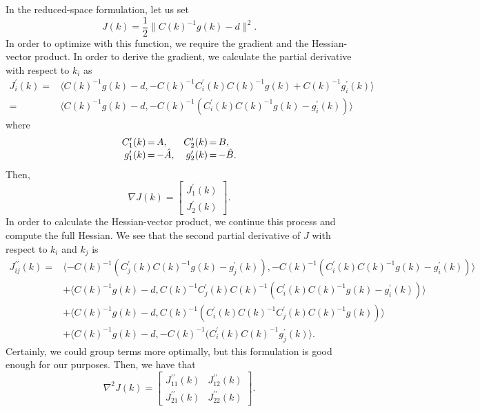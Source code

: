 \documentclass{report}
\begin{document}
        In the reduced-space formulation, let us set 
$$
    J(k) = \frac{1}{2} \| C(k)^{-1}g(k) - d \|^2.
$$
In order to optimize with this function, we require the gradient and the Hessian-vector product.  In order to derive the gradient, we calculate the partial derivative with respect to $k_i$ as
\begin{align*}
    J^\prime_i(k)
    =& \langle C(k)^{-1}g(k) - d, -C(k)^{-1} C^\prime_i(k) C(k)^{-1}g(k) + C(k)^{-1}g^\prime_i(k)\rangle\\
    =& \langle C(k)^{-1}g(k) - d, -C(k)^{-1} (C^\prime_i(k) C(k)^{-1}g(k) - g^\prime_i(k))\rangle
\end{align*}
where
$$\begin{array}{r@{\,=\,}lr@{\,=\,}l}
        C^\prime_1(k) & A,&
        C^\prime_2(k) & B,\\
        g^\prime_1(k) & -\hat{A},&
        g^\prime_2(k) & -\hat{B}.
\end{array}$$
Then,
$$
        \nabla J(k) = \begin{bmatrix}
                J^\prime_1(k)\\
                J^\prime_2(k)
            \end{bmatrix}.
$$
In order to calculate the Hessian-vector product, we continue this process and compute the full Hessian.  We see that the second partial derivative of $J$ with respect to $k_i$ and $k_j$ is
\begin{align*}
    J^{\prime\prime}_{ij}(k)
        =& \langle -C(k)^{-1} (C^\prime_j(k) C(k)^{-1}g(k) - g^\prime_j(k)), -C(k)^{-1} (C^\prime_i(k) C(k)^{-1}g(k) - g^\prime_i(k))\rangle\\
        &+ \langle C(k)^{-1}g(k) - d, C(k)^{-1} C^\prime_j(k) C(k)^{-1}(C^\prime_i(k) C(k)^{-1}g(k) - g^\prime_i(k))\rangle\\
        &+ \langle C(k)^{-1}g(k) - d, C(k)^{-1}(C^\prime_i(k) C(k)^{-1}C^\prime_j(k)C(k)^{-1}g(k))\rangle\\
        &+ \langle C(k)^{-1}g(k) - d, -C(k)^{-1}(C^\prime_i(k) C(k)^{-1}g^\prime_j(k)\rangle.
\end{align*}
Certainly, we could group terms more optimally, but this formulation is good enough for our purposes.  Then, we have that
$$
        \nabla^2 J(k) = \begin{bmatrix}
                J^{\prime\prime}_{11}(k) & J^{\prime\prime}_{12}(k)\\
                J^{\prime\prime}_{21}(k) & J^{\prime\prime}_{22}(k)
            \end{bmatrix}.
$$
\end{document}
